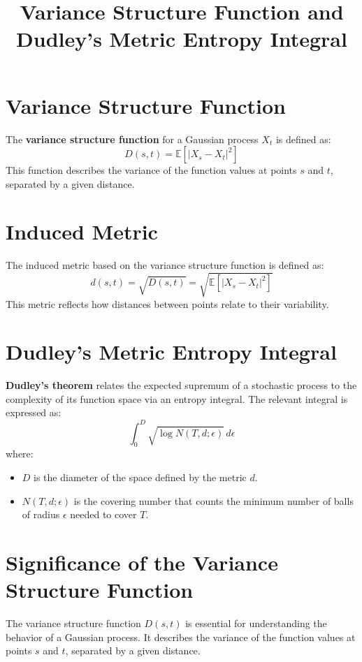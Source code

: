 \documentclass{article}
\title{Variance Structure Function and Dudley's Metric Entropy Integral}
\author{}
\date{}
\begin{document}
\maketitle

\section{Variance Structure Function}
The \textbf{variance structure function} for a Gaussian process $X_t$ is defined as:
\begin{equation}
D(s, t) = \mathbb{E}[|X_s - X_t|^2]
\end{equation}
This function describes the variance of the function values at points $s$ and $t$, separated by a given distance.

\section{Induced Metric}
The induced metric based on the variance structure function is defined as:
\begin{equation}
d(s, t) = \sqrt{D(s, t)} = \sqrt{\mathbb{E}[|X_s - X_t|^2]}
\end{equation}
This metric reflects how distances between points relate to their variability.

\section{Dudley’s Metric Entropy Integral}
\textbf{Dudley’s theorem} relates the expected supremum of a stochastic process to the complexity of its function space via an entropy integral. The relevant integral is expressed as:
\begin{equation}
\int_0^{D} \sqrt{\log N(T, d; \epsilon)} \, d\epsilon
\end{equation}
where:
\begin{itemize}
  \item $D$ is the diameter of the space defined by the metric $d$.
  \item $N(T, d; \epsilon)$ is the covering number that counts the minimum number of balls of radius $\epsilon$ needed to cover $T$.
\end{itemize}

\section{Significance of the Variance Structure Function}
The variance structure function $D(s, t)$ is essential for understanding the behavior of a Gaussian process. It describes the variance of the function values at points $s$ and $t$, separated by a given distance.
\end{document}
